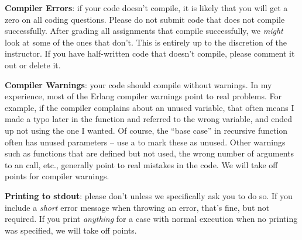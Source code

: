 \documentclass{article}
\begin{document}
\textbf{Compiler Errors}: if your code doesn't compile, it is likely that you
will get a zero on all coding questions.
Please do not submit code that does not compile successfully.
After grading all assignments that compile successfully,
we \emph{might} look at some of the ones that don't.
This is entirely up to the discretion of the instructor.
If you have half-written code that doesn't compile, please comment
it out or delete it.

\textbf{Compiler Warnings}: your code should compile without warnings.
In my experience, most of the Erlang compiler warnings point to real problems.
For example, if the compiler complains about an unused variable, that often
means I made a typo later in the function and referred to the wrong variable,
and ended up not using the one I wanted.  Of course, the ``base case'' in recursive
function often has unused parameters -- use a \code{\_} to mark these as unused.
Other warnings such as functions that are defined but not used, the wrong number
of arguments to an
call, etc., generally point to real mistakes
in the code.  We will take off points for compiler warnings.

\textbf{Printing to stdout}: please don't unless we specifically ask you to do so.
If you include a \emph{short} error message when throwing an error, that's
fine, but not required.  If you print \emph{anything} for a case with normal
execution when no printing was specified, we will take off points.
\end{document}
